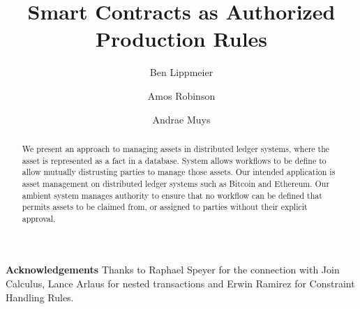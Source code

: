 \documentclass[format=sigconf, review=true, screen=true]{acmart}
\begin{document}

\title
{       Smart Contracts as Authorized Production Rules}



\author{Ben Lippmeier}

\author{Amos Robinson}

\author{Andrae Muys}

\begin{abstract}
We present an approach to managing assets in distributed ledger systems, where the asset is represented as a fact in a database. System allows workflows to be define to allow mutually distrusting parties to manage those assets. Our intended application is asset management on distributed ledger systems such as Bitcoin and Ethereum. Our ambient system manages authority to ensure that no workflow can be defined that permits assets to be claimed from, or assigned to parties without their explicit approval.
\end{abstract}

\maketitle
\makeatactive










\textbf{Acknowledgements}
Thanks to Raphael Speyer for the connection with Join Calculus, Lance Arlaus for nested transactions and Erwin Ramirez for Constraint Handling Rules.


\clearpage{}


\end{document}
